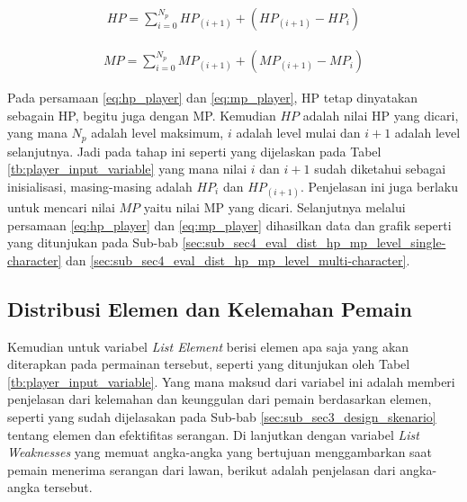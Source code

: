 \begin{equation}\label{eq:hp_player}
	\begin{split}
		HP = \sum_{i = 0}^{N_{p}} HP_{(i + 1)} + \left(HP_{(i + 1)} - HP_{i} \right)
	\end{split}
\end{equation}

\begin{equation}\label{eq:mp_player}
	\begin{split}
		MP = \sum_{i = 0}^{N_{p}} MP_{(i + 1)} + \left(MP_{(i + 1)} - MP_{i} \right)
	\end{split}
\end{equation}

Pada persamaan \ref{eq:hp_player} dan \ref{eq:mp_player}, HP tetap dinyatakan sebagain HP, begitu juga dengan MP. Kemudian $HP$ adalah nilai HP yang dicari, yang mana $N_{p}$ adalah level maksimum, $i$ adalah level mulai dan $i + 1$ adalah level selanjutnya. Jadi pada tahap ini seperti yang dijelaskan pada Tabel \ref{tb:player_input_variable} yang mana nilai $i$ dan $i + 1$ sudah diketahui sebagai inisialisasi, masing-masing adalah $HP_{i}$ dan $HP_{(i + 1)}$. Penjelasan ini juga berlaku untuk mencari nilai $MP$ yaitu nilai MP yang dicari. Selanjutnya melalui persamaan \ref{eq:hp_player} dan \ref{eq:mp_player} dihasilkan data dan grafik seperti yang ditunjukan pada Sub-bab \ref{sec:sub_sec4_eval_dist_hp_mp_level_single-character} dan \ref{sec:sub_sec4_eval_dist_hp_mp_level_multi-character}.
\vspace{1ex}

\subsection{Distribusi Elemen dan Kelemahan Pemain}
\label{sec:sub_sec3_list_element_player}
\vspace{1ex}

Kemudian untuk variabel \textit{List Element} berisi elemen apa saja yang akan diterapkan pada permainan tersebut, seperti yang ditunjukan oleh Tabel \ref{tb:player_input_variable}. Yang mana maksud dari variabel ini adalah memberi penjelasan dari kelemahan dan keunggulan dari pemain berdasarkan elemen, seperti yang sudah dijelasakan pada Sub-bab \ref{sec:sub_sec3_design_skenario} tentang elemen dan efektifitas serangan. Di lanjutkan dengan variabel \textit{List Weaknesses} yang memuat angka-angka yang bertujuan menggambarkan saat pemain menerima serangan dari lawan, berikut adalah penjelasan dari angka-angka tersebut.

